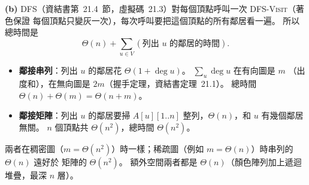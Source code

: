 \begin{pastsoln}
\textbf{(b)} DFS（資結書第~21.4~節，虛擬碼~21.3）對每個頂點呼叫一次 \textsc{DFS-Visit}（著色保證
每個頂點只變灰一次），每次呼叫要把這個頂點的所有鄰居看一遍。 所以總時間是
\[
\Theta(n) + \sum_{u \in V} (\text{列出 } u \text{ 的鄰居的時間}).
\]
\begin{itemize}
\item \textbf{鄰接串列}：列出 $u$ 的鄰居花 $\Theta(1 + \deg u)$。 $\sum_u \deg u$ 在有向圖是 $m$
（出度和），在無向圖是 $2m$（握手定理，資結書定理~21.1）。 總時間
$\Theta(n) + \Theta(m) = \Theta(n + m)$。
\item \textbf{鄰接矩陣}：列出 $u$ 的鄰居要掃 $A[u][1..n]$ 整列，$\Theta(n)$，和 $u$ 有幾個鄰居無關。
$n$ 個頂點共 $\Theta(n^2)$，總時間 $\Theta(n^2)$。
\end{itemize}
兩者在稠密圖（$m = \Theta(n^2)$）時一樣；稀疏圖（例如 $m = \Theta(n)$）時串列的 $\Theta(n)$ 遠好於
矩陣的 $\Theta(n^2)$。 額外空間兩者都是 $\Theta(n)$（顏色陣列加上遞迴堆疊，最深 $n$ 層）。
\end{pastsoln}

